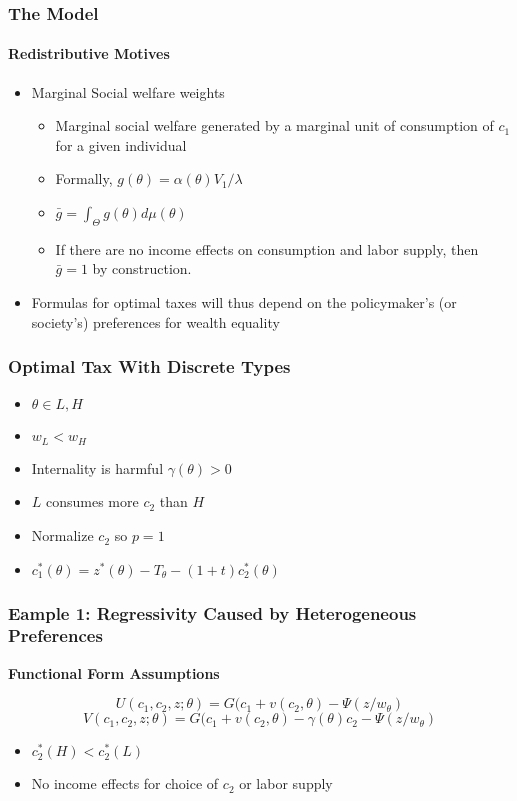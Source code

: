 \documentclass{beamer}
\begin{document}
\begin{frame}
\frametitle{The Model}
\framesubtitle{Redistributive Motives}
\begin{itemize}
	\item Marginal Social welfare weights 
	\begin{itemize}
		\item Marginal social welfare generated by a marginal unit of consumption of $c_1$ for a given individual 
		\item Formally, $g(\theta) = \alpha(\theta)V_1/\lambda$
		\item $\bar{g} = \int_{\Theta}^{}g(\theta)d\mu(\theta)$
		\item If there are no income effects on consumption and labor
		supply, then $\bar{g} =1$ by construction.
	\end{itemize}
\item Formulas for optimal taxes will thus depend on the policymaker’s (or society’s) preferences for wealth equality
	
\end{itemize}

\end{frame}






\begin{frame}
\frametitle{Optimal Tax With Discrete Types}

\begin{itemize}
	\item $\theta \in {L,H}$
	\item $w_L < w_H$
	\item Internality  is harmful $\gamma(\theta) > 0$
	\item $L$ consumes more $c_2$ than $H$
	\item Normalize $c_2$ so $p=1$
	\item $c_1^*(\theta) = z^*(\theta) - T_{\theta} - (1+t)c_2^*(\theta)$
	
\end{itemize}

\end{frame}






\begin{frame}
\frametitle{Eample 1: Regressivity Caused by Heterogeneous Preferences   }

\textbf{Functional Form Assumptions}

$$ U(c_1, c_2,z;\theta) = G(c_1 + v(c_2, \theta) - \Psi(z/w_{\theta}) $$
$$ V(c_1, c_2,z;\theta) = G(c_1 + v(c_2, \theta) - \gamma(\theta)c_2 - \Psi(z/w_{\theta})
$$
\begin{itemize}
	\item $c_2^*(H) < c_2^*(L)$
	\item No income effects for choice of $c_2$ or labor supply 
\end{itemize}
\end{frame}
	
\end{document}
